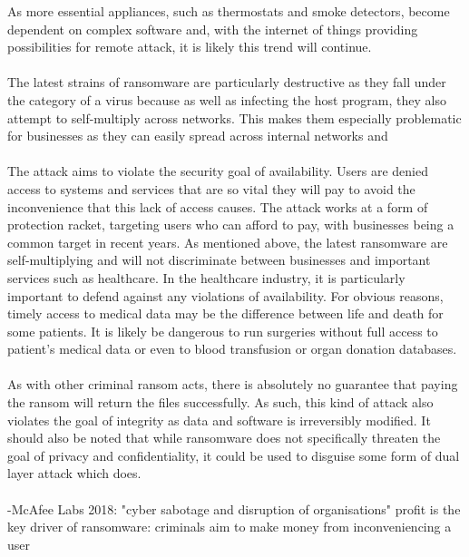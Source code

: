 \documentclass{article}
\begin{document}
As more essential appliances, such as thermostats and smoke detectors, become dependent on complex software and, with the internet of things providing possibilities for remote attack, it is likely this trend will continue.
\\\\
The latest strains of ransomware are particularly destructive as they fall under the category of a virus because as well as infecting the host program, they also attempt to self-multiply across networks. This makes them especially problematic for businesses as they can easily spread across internal networks and 
\\\\
The attack aims to violate the security goal of availability. Users are denied access to systems and services that are so vital they will pay to avoid the inconvenience that this lack of access causes.
The attack works at a form of protection racket, targeting users who can afford to pay, with businesses being a common target in recent years.
As mentioned above, the latest ransomware are self-multiplying and will not discriminate between businesses and important services such as healthcare.
In the healthcare industry, it is particularly important to defend against any violations of availability.
For obvious reasons, timely access to medical data may be the difference between life and death for some patients.
It is likely be dangerous to run surgeries without full access to patient's medical data or even to blood transfusion or organ donation databases.
\\\\
As with other criminal ransom acts, there is absolutely no guarantee that paying the ransom will return the files successfully\cite{ncsc_mitigating_malware}. As such, this kind of attack also violates the goal of integrity as data and software is irreversibly modified.
It should also be noted that while ransomware does not specifically threaten the goal of privacy and confidentiality, it could be used to disguise some form of dual layer attack which does.
\\\\


-McAfee Labs 2018:\cite{mcafee_2018}
"cyber sabotage and disruption of organisations"
profit is the key driver of ransomware: criminals aim to make money from inconveniencing a user
\end{document}
